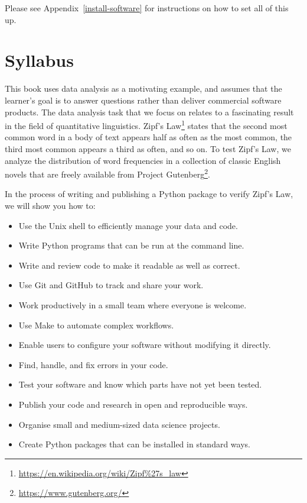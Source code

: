 \documentclass[
]{krantz}
\providecommand{\tightlist}{%
  \setlength{\itemsep}{0pt}\setlength{\parskip}{0pt}}
\renewcommand{\href}[2]{#2\footnote{\url{#1}}}
\begin{document}
Please see Appendix~\ref{install-software} for instructions on how to set all of this up.

\hypertarget{intro-syllabus}{%
\section{Syllabus}\label{intro-syllabus}}

This book uses data analysis as a motivating example,
and assumes that the learner's goal is to answer questions
rather than deliver commercial software products.
The data analysis task that we focus on
relates to a fascinating result in the field of quantitative linguistics.
\href{https://en.wikipedia.org/wiki/Zipf\%27s_law}{Zipf's Law} states that the second most common word in a body of text
appears half as often as the most common,
the third most common appears a third as often, and so on.
To test Zipf's Law,
we analyze the distribution of word frequencies
in a collection of classic English novels
that are freely available from \href{https://www.gutenberg.org/}{Project Gutenberg}.

In the process of writing and publishing a Python package to verify Zipf's Law,
we will show you how to:

\begin{itemize}
\tightlist
\item
  Use the Unix shell to efficiently manage your data and code.
\item
  Write Python programs that can be run at the command line.
\item
  Write and review code to make it readable as well as correct.
\item
  Use Git and GitHub to track and share your work.
\item
  Work productively in a small team where everyone is welcome.
\item
  Use Make to automate complex workflows.
\item
  Enable users to configure your software without modifying it directly.
\item
  Find, handle, and fix errors in your code.
\item
  Test your software and know which parts have not yet been tested.
\item
  Publish your code and research in open and reproducible ways.
\item
  Organise small and medium-sized data science projects.
\item
  Create Python packages that can be installed in standard ways.
\end{itemize}
\end{document}
